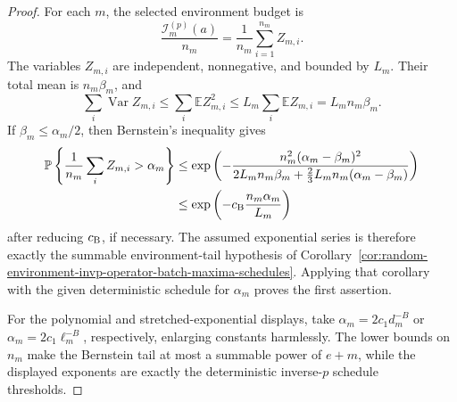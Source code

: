 \documentclass[11pt]{amsart}
\numberwithin{equation}{section}
\theoremstyle{definition}
\theoremstyle{remark}
\newcommand{\Prob}{\mathbb P}
\newcommand{\Exp}{\mathbb E}
\begin{document}
\begin{proof}
For each \(m\), the selected environment budget is
\[
  \frac{\mathcal I_m^{(p)}(a)}{n_m}
  =\frac1{n_m}\sum_{i=1}^{n_m}Z_{m,i}.
\]
The variables \(Z_{m,i}\) are independent, nonnegative, and bounded by \(L_m\).
Their total mean is \(n_m\beta_m\), and
\[
  \sum_i \operatorname{Var} Z_{m,i}\le \sum_i \Exp Z_{m,i}^2
  \le L_m\sum_i\Exp Z_{m,i}
  =L_m n_m\beta_m .
\]
If \(\beta_m\le\alpha_m/2\), then Bernstein's inequality gives
\[
\begin{aligned}
  \Prob\left\{\frac1{n_m}\sum_i Z_{m,i}>\alpha_m\right\}
  &\le
  \exp\left(
  -\frac{n_m^2(\alpha_m-\beta_m)^2}
  {2L_m n_m\beta_m+\frac23L_m n_m(\alpha_m-\beta_m)}
  \right)  \\
  &\le
  \exp\left(-c_{\rm B}\frac{n_m\alpha_m}{L_m}\right)
\end{aligned}
\]
after reducing \(c_{\rm B}\), if necessary.  The assumed exponential series is
therefore exactly the summable environment-tail hypothesis of
Corollary~\ref{cor:random-environment-invp-operator-batch-maxima-schedules}.
Applying that corollary with the given deterministic schedule for
\(\alpha_m\) proves the first assertion.

For the polynomial and stretched-exponential displays, take
\(\alpha_m=2c_1d_m^{-B}\) or \(\alpha_m=2c_1\ell_m^{-B}\), respectively,
enlarging constants harmlessly.  The lower bounds on \(n_m\) make the
Bernstein tail at most a summable power of \(e+m\), while the displayed
exponents are exactly the deterministic inverse-\(p\) schedule thresholds.
\end{proof}
\end{document}
